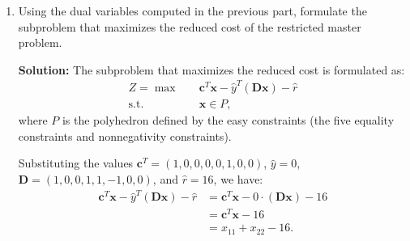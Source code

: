 \documentclass[11pt]{article}
\newcommand{\mb}[1]{\ensuremath{\boldsymbol{#1}}}
\begin{document}
\begin{enumerate}
\begin{enumerate}
The dual problem is:
\begin{align*}
\min \quad & 20y_1 + y_2 \\
\text{s.t.} \quad & 0 \cdot y_1 + y_2 \geq 16 \quad \text{(corresponding to $\lambda_1$)}, \\
                       & 8y_1 + y_2 \geq 8 \quad \text{(corresponding to $\lambda_2$)}, \\
                       & y_1 + 0 \cdot y_2 \geq 0 \quad \text{(corresponding to $\mu$)}, \\
                       & y_1 \text{ is free}, y_2 \text{ is free}.
\end{align*}
Note: Since the first primal constraint is an equation, $y_1$ is free. Since the second primal constraint is an equation, $y_2$ is free.

From the optimal primal solution, we have $\lambda_1 = 1 > 0$, $\lambda_2 = 0$, and $\mu = 20 > 0$.

By complementary slackness:
\begin{itemize}
\item Since $\lambda_1 > 0$, the first dual constraint must hold with equality: $0 \cdot y_1 + y_2 = 16$, which gives $y_2 = 16$. This corresponds to $\hat{r} = 16$.
\item Since $\mu > 0$, the third dual constraint must hold with equality: $y_1 + 0 \cdot y_2 = 0$, which gives $y_1 = 0$. This corresponds to $\hat{y} = 0$.
\end{itemize}

Therefore, $\hat{y} = 0$ and $\hat{r} = 16$, which matches the result from Method 1.

\item Using the dual variables computed in the previous part, formulate the subproblem that maximizes the reduced cost of the restricted master problem.

\textbf{Solution:} The subproblem that maximizes the reduced cost is formulated as:
\begin{align*}
Z = \max \quad & \mb{c}^T\mb{x} - \hat{y}^T(\mb{D}\mb{x}) - \hat{r} \\
\text{s.t.} \quad & \mb{x} \in P,
\end{align*}
where $P$ is the polyhedron defined by the easy constraints (the five equality constraints and nonnegativity constraints).

Substituting the values $\mb{c}^T = (1, 0, 0, 0, 0, 1, 0, 0)$, $\hat{y} = 0$, $\mb{D} = (1, 0, 0, 1, 1, -1, 0, 0)$, and $\hat{r} = 16$, we have:
\begin{align*}
\mb{c}^T\mb{x} - \hat{y}^T(\mb{D}\mb{x}) - \hat{r} &= \mb{c}^T\mb{x} - 0 \cdot (\mb{D}\mb{x}) - 16 \\
&= \mb{c}^T\mb{x} - 16 \\
&= x_{11} + x_{22} - 16.
\end{align*}


\end{enumerate}
\end{enumerate}
\end{document}
